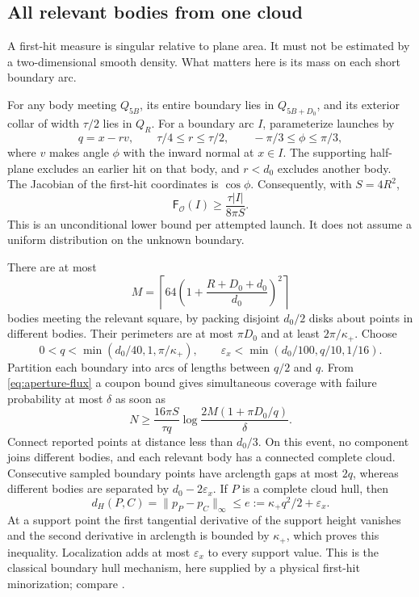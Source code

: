 \subsection{All relevant bodies from one cloud}
A first-hit measure is singular relative to plane area. It must not be
estimated by a two-dimensional smooth density. What matters here is its
mass on each short boundary arc.

For any body meeting $Q_{5B}$, its entire boundary lies in
$Q_{5B+D_0}$, and its exterior collar of width $\tau/2$ lies in $Q_R$.
For a boundary arc $I$, parameterize launches by
\[
 q=x-rv,\qquad \tau/4\le r\le\tau/2,\qquad
                 -\pi/3\le\phi\le\pi/3,
\]
where $v$ makes angle $\phi$ with the inward normal at $x\in I$.
The supporting half-plane excludes an earlier hit on that body, and
$r<d_0$ excludes another body. The Jacobian of the first-hit coordinates
is $\cos\phi$. Consequently, with $S=4R^2$,
\begin{equation}\label{eq:aperture-flux}
       \mathsf F_{\mathcal O}(I)\ge\frac{\tau|I|}{8\pi S}.
\end{equation}
This is an unconditional lower bound per attempted launch. It does not
assume a uniform distribution on the unknown boundary.

There are at most
\[
 M=\left\lceil64\left(1+\frac{R+D_0+d_0}{d_0}\right)^2\right\rceil
\]
bodies meeting the relevant square, by packing disjoint $d_0/2$ disks
about points in different bodies. Their perimeters are at most $\pi D_0$
and at least $2\pi/\kappa_+$. Choose
\[
 0<q<\min(d_0/40,1,\pi/\kappa_+),\qquad
 \varepsilon_x<\min(d_0/100,q/10,1/16).
\]
Partition each boundary into arcs of lengths between $q/2$ and $q$.
From \eqref{eq:aperture-flux} a coupon bound gives simultaneous coverage
with failure probability at most $\delta$ as soon as
\begin{equation}\label{eq:aperture-coupon}
 N\ge\frac{16\pi S}{\tau q}
       \log\frac{2M(1+\pi D_0/q)}{\delta}.
\end{equation}
Connect reported points at distance less than $d_0/3$. On this event,
no component joins different bodies, and each relevant body has a
connected complete cloud. Consecutive sampled boundary points have
arclength gaps at most $2q$, whereas different bodies are separated by
$d_0-2\varepsilon_x$. If $P$ is a complete cloud hull, then
\begin{equation}\label{eq:aperture-hull}
 d_H(P,C)=\|p_P-p_C\|_\infty
                 \le e:=\kappa_+q^2/2+\varepsilon_x.
\end{equation}
At a support point the first tangential derivative of the support height
vanishes and the second derivative in arclength is bounded by
$\kappa_+$, which proves this inequality. Localization adds at most
$\varepsilon_x$ to every support value. This is the classical boundary
hull mechanism, here supplied by a physical first-hit minorization;
compare \cite{Schneider,PSSW}.

